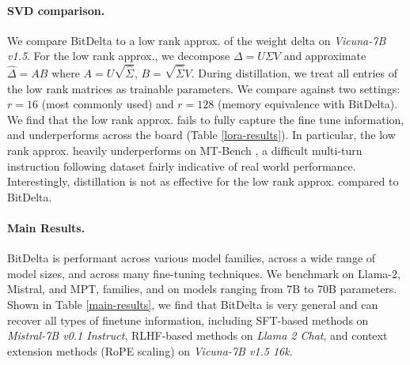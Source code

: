 \documentclass[numbers]{article}
\newcommand{\oursmethod}{BitDelta\xspace}
\begin{document}
\begin{table}
    \centering
    \caption{\oursmethod \ achieves over 10$\times$ compression. We can further compress the embedding and LM head layers, but leave this to future work due to inconsistencies in tokenizer vocabularies.}
    \label{xfactor-results}
    
\end{table}

\paragraph{SVD comparison. } 
We compare \oursmethod to a low rank approx. of the weight delta on \textit{Vicuna-7B v1.5}. For the low rank approx., we decompose $\Delta=U\Sigma V$ and approximate $\hat{\Delta}=AB$ where $A=U\sqrt{\hat{\Sigma}}$, $B=\sqrt{\hat{\Sigma}}V$. During distillation, we treat all entries of the low rank matrices as trainable parameters. We compare against two settings: $r=16$ (most commonly used) and $r=128$ (memory equivalence with \oursmethod). We find that the low rank approx. fails to fully capture the fine tune information, and underperforms across the board (Table \ref{lora-results}). In particular, the low rank approx. heavily underperforms on MT-Bench \cite{vicuna2023}, a difficult multi-turn instruction following dataset fairly indicative of real world performance. Interestingly, distillation is not as effective for the low rank approx. compared to \oursmethod. %



\paragraph{Main Results. } \oursmethod is performant across various model families, across a wide range of model sizes, and across many fine-tuning techniques. We benchmark on Llama-2, Mistral, and MPT, families, and on models ranging from 7B to 70B parameters. Shown in Table \ref{main-results}, we find that \oursmethod is very general and can recover all types of finetune information, including SFT-based methods \cite{radford2018improving} on \textit{Mistral-7B v0.1 Instruct}, RLHF-based methods \cite{ christiano2023deep} on \textit{Llama 2 Chat}, and context extension methods (RoPE scaling) \cite{chen2023extending,press2022train} on \textit{Vicuna-7B v1.5 16k}.  
\end{document}
